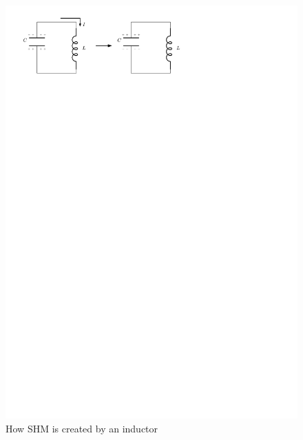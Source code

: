 \documentclass{article}
\begin{document}
\begin{itemize}
\begin{figure}[H]
          \includegraphics{figures/inductor2.pdf}
          \caption{How SHM is created by an inductor}
        \end{figure}
      \end{itemize}
\end{document}
